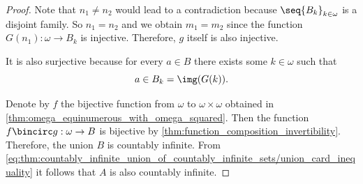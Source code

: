 \begin{proof}
  Note that \( n_1 \neq n_2 \) would lead to a contradiction because  \( \seq{ B_k }_{k \in \omega} \) is a disjoint family. So \( n_1 = n_2 \) and we obtain \( m_1 = m_2 \) since the function \( G(n_1): \omega \to B_k \) is injective. Therefore, \( g \) itself is also injective.

  It is also surjective because for every \( a \in B \) there exists some \( k \in \omega \) such that
  \begin{equation*}
    a \in B_k = \img(G(k)).
  \end{equation*}

  Denote by \( f \) the bijective function from \( \omega \) to \( \omega \times \omega \) obtained in \cref{thm:omega_equinumerous_with_omega_squared}. Then the function \( f \bincirc g: \omega \to B \) is bijective by \cref{thm:function_composition_invertibility}. Therefore, the union \( B \) is countably infinite. From \eqref{eq:thm:countably_infinite_union_of_countably_infinite_sets/union_card_inequality} it follows that \( A \) is also countably infinite.
\end{proof}

